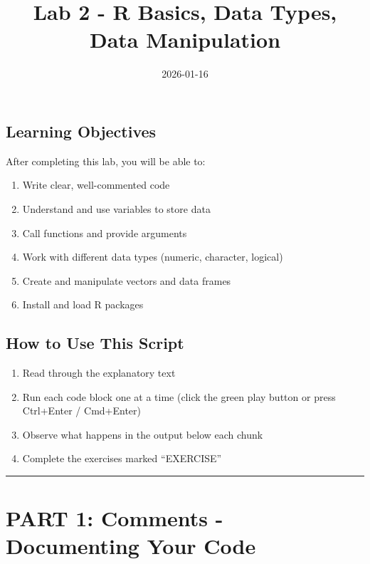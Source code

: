 \documentclass[
]{article}
\title{Lab 2 - R Basics, Data Types, Data Manipulation}
\author{}
\date{\vspace{-2.5em}2026-01-16}
\providecommand{\tightlist}{%
  \setlength{\itemsep}{0pt}\setlength{\parskip}{0pt}}
\begin{document}
\maketitle

\subsection{Learning Objectives}\label{learning-objectives}

After completing this lab, you will be able to:

\begin{enumerate}
\def\labelenumi{\arabic{enumi}.}
\tightlist
\item
  Write clear, well-commented code
\item
  Understand and use variables to store data
\item
  Call functions and provide arguments
\item
  Work with different data types (numeric, character, logical)
\item
  Create and manipulate vectors and data frames
\item
  Install and load R packages
\end{enumerate}

\subsection{How to Use This Script}\label{how-to-use-this-script}

\begin{enumerate}
\def\labelenumi{\arabic{enumi}.}
\tightlist
\item
  Read through the explanatory text
\item
  Run each code block one at a time (click the green play button or
  press Ctrl+Enter / Cmd+Enter)
\item
  Observe what happens in the output below each chunk
\item
  Complete the exercises marked ``EXERCISE''
\end{enumerate}

\begin{center}\rule{0.5\linewidth}{0.5pt}\end{center}

\section{PART 1: Comments - Documenting Your
Code}\label{part-1-comments---documenting-your-code}
\end{document}
